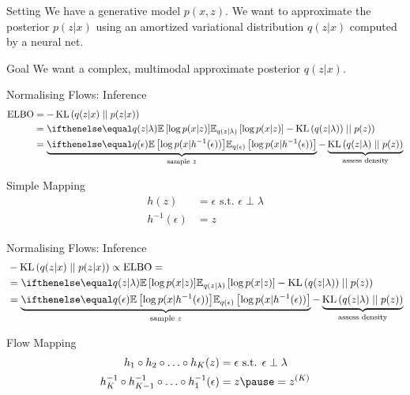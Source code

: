 \begin{frame}{Setting}
We have a generative model $ p(x,z) $. We want to approximate the posterior $ p(z|x) $ using an amortized variational distribution $ q(z|x) $ computed by a neural net.
\pause
\begin{block}{Goal}
We want a complex, multimodal approximate posterior $ q(z|x) $.
\end{block}
\end{frame}

\begin{frame}{Normalising Flows: Inference}
\begin{equation*}
\begin{aligned}
\ELBO &= -\KL{q(z|x)}{p(z|x)} \\
&= \E[q(z|\lambda)]{\log p(x|z)} - \KL{q(z|\lambda))}{p(z)} \\
&= \underbrace{\E[q(\epsilon)]{\log p(x|h^{-1}(\epsilon))}}_{\text{sample $ z $}} - \underbrace{\KL{q(z|\lambda)}{p(z)}}_{\text{assess density}}
\end{aligned}
\end{equation*}
\begin{block}{Simple Mapping}
\begin{equation*}
\begin{aligned}
h(z) &= \epsilon \text{ s.t. } \epsilon \perp \lambda \\
h^{-1}(\epsilon) &= z
\end{aligned}
\end{equation*}
\end{block}
\end{frame}

\begin{frame}{Normalising Flows: Inference}
\begin{equation*}
\begin{aligned}
&-\KL{q(z|x)}{p(z|x)} \propto \ELBO = \\
&= \E[q(z|\lambda)]{\log p(x|z)} - \KL{q(z|\lambda))}{p(z)} \\
&= \underbrace{\E[q(\epsilon)]{\log p(x|h^{-1}(\epsilon))}}_{\text{sample $ z $}} - \underbrace{\KL{q(z|\lambda)}{p(z)}}_{\text{assess density}}
\end{aligned}
\end{equation*}
\begin{block}{Flow Mapping}
\begin{equation*}
\begin{aligned}
h_{1}\circ h_{2}\circ \ldots \circ h_{K}(z) &= \epsilon \text{ s.t. } \epsilon \perp \lambda \\
h^{-1}_{K}\circ h^{-1}_{K-1}\circ\ldots \circ h^{-1}_{1}(\epsilon) &= z \pause = z^{(K)}
\end{aligned}
\end{equation*}
\end{block}
\end{frame}

